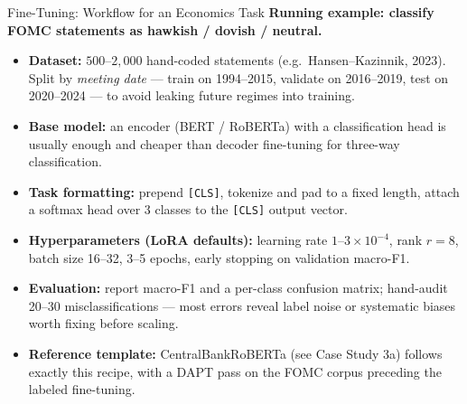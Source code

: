 \documentclass[10pt,english,aspectratio=169]{beamer}
\begin{document}
\begin{frame}{Fine-Tuning: Workflow for an Economics Task}
\textbf{Running example: classify FOMC statements as hawkish / dovish / neutral.}
\begin{itemize}
\item \textbf{Dataset:} $500$--$2{,}000$ hand-coded statements (e.g.\ Hansen--Kazinnik, 2023). Split by \emph{meeting date} --- train on 1994--2015, validate on 2016--2019, test on 2020--2024 --- to avoid leaking future regimes into training.

\medskip
\item \textbf{Base model:} an encoder (BERT / RoBERTa) with a classification head is usually enough and cheaper than decoder fine-tuning for three-way classification.

\medskip
\item \textbf{Task formatting:} prepend \texttt{[CLS]}, tokenize and pad to a fixed length, attach a softmax head over 3 classes to the \texttt{[CLS]} output vector.

\medskip
\item \textbf{Hyperparameters (LoRA defaults):} learning rate $1$--$3 \times 10^{-4}$, rank $r = 8$, batch size 16--32, 3--5 epochs, early stopping on validation macro-F1.

\medskip
\item \textbf{Evaluation:} report macro-F1 and a per-class confusion matrix; hand-audit 20--30 misclassifications --- most errors reveal label noise or systematic biases worth fixing before scaling.

\medskip
\item \textbf{Reference template:} CentralBankRoBERTa (see Case Study 3a) follows exactly this recipe, with a DAPT pass on the FOMC corpus preceding the labeled fine-tuning.
\end{itemize}
\end{frame}
\end{document}

